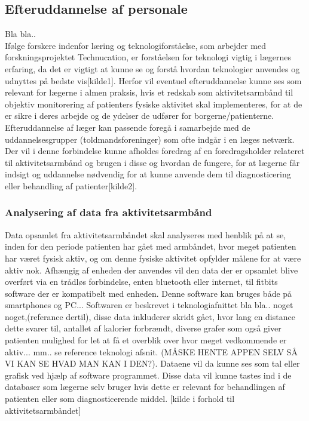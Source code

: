 
\subsection{Efteruddannelse af personale}
Bla bla..\\
Ifølge forskere indenfor læring og teknologiforståelse, som arbejder med forskningsprojektet Technucation, er forståelsen for teknologi vigtig i lægernes erfaring, da det er vigtigt at kunne se og forstå hvordan teknologier anvendes og udnyttes på bedste vis[kilde1]. Herfor vil eventuel efteruddannelse kunne ses som relevant for lægerne i almen praksis, hvis et redskab som aktivitetsarmbånd til objektiv monitorering af patienters fysiske aktivitet skal implementeres, for at de er sikre i deres arbejde og de ydelser de udfører for borgerne/patienterne. 
Efteruddannelse af læger kan passende foregå i samarbejde med de uddannelsesgrupper (toldmandsforeninger) som ofte indgår i en læges netværk. Der vil i denne forbindelse kunne afholdes foredrag af en foredragsholder relateret til aktivitetsarmbånd og brugen i disse og hvordan de fungere, for at lægerne får indsigt og uddannelse nødvendig for at kunne anvende dem til diagnosticering eller behandling af patienter[kilde2]. 
\\
\subsubsection{Analysering af data fra aktivitetsarmbånd}  
Data opsamlet fra aktivitetsarmbåndet skal analyseres med henblik på at se, inden for den periode patienten har gået med armbåndet, hvor meget patienten har været fysisk aktiv, og om denne fysiske aktivitet opfylder målene for at være aktiv nok.  
Afhængig af enheden der anvendes vil den data der er opsamlet blive overført via en trådløs forbindelse, enten bluetooth eller internet, til fitbits software der er kompatibelt med enheden. Denne software kan bruges både på smartphones og PC... Softwaren er beskrevet i teknologiafnittet bla bla.. noget noget,(referance dertil), disse data inkluderer skridt gået, hvor lang en distance dette svarer til, antallet af kalorier forbrændt, diverse grafer som også giver patienten mulighed for let at få et overblik over hvor meget vedkommende er aktiv... mm.. se reference teknologi afsnit. (MÅSKE HENTE APPEN SELV SÅ VI KAN SE HVAD MAN KAN I DEN?). Dataene vil da kunne ses som tal eller grafisk ved hjælp af software programmet. Disse data vil kunne tastes ind i de databaser som lægerne selv bruger hvis dette er relevant for behandlingen af patienten eller som diagnosticerende middel. [kilde i forhold til aktivitetsarmbåndet]

